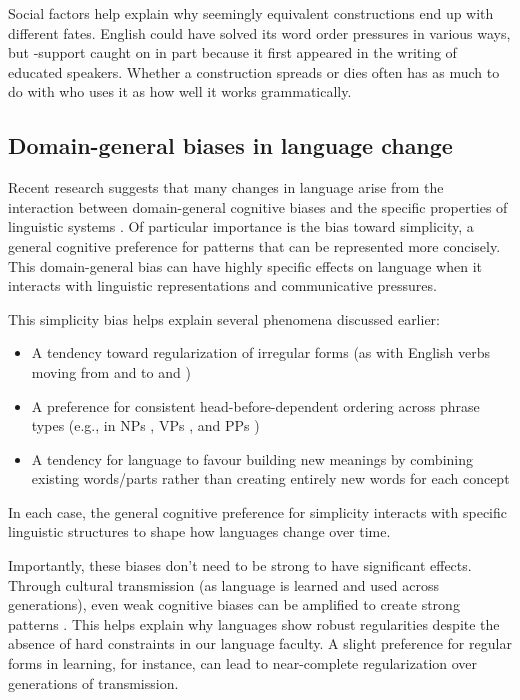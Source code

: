Social factors help explain why seemingly equivalent constructions end up with different fates. English could have solved its word order pressures in various ways, but -support caught on in part because it first appeared in the writing of educated speakers. Whether a construction spreads or dies often has as much to do with who uses it as how well it works grammatically.

\subsection{Domain-general biases in language change}

Recent research suggests that many changes in language arise from the interaction between domain-general cognitive biases and the specific properties of linguistic systems \citep{culbertson2016simplicity}. Of particular importance is the bias toward simplicity, a general cognitive preference for patterns that can be represented more concisely. This domain-general bias can have highly specific effects on language when it interacts with linguistic representations and communicative pressures.

This simplicity bias helps explain several phenomena discussed earlier:
\begin{itemize}[noitemsep]
    \item A tendency toward regularization of irregular forms (as with English verbs moving from  and  to  and )
    \item A preference for consistent head-before-dependent ordering across phrase types (e.g., in NPs , VPs , and PPs )
    \item A tendency for language to favour building new meanings by combining existing words/parts rather than creating entirely new words for each concept
\end{itemize}

In each case, the general cognitive preference for simplicity interacts with specific linguistic structures to shape how languages change over time.

Importantly, these biases don't need to be strong to have significant effects. Through cultural transmission (as language is learned and used across generations), even weak cognitive biases can be amplified to create strong patterns \citep{culbertson2016simplicity}. This helps explain why languages show robust regularities despite the absence of hard constraints in our language faculty. A slight preference for regular forms in learning, for instance, can lead to near-complete regularization over generations of transmission.


